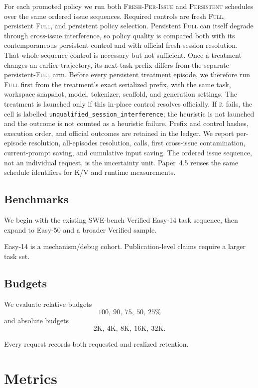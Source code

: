 \documentclass[11pt]{article}
\begin{document}
For each promoted policy we run both \textsc{Fresh-Per-Issue} and
\textsc{Persistent} schedules over the same ordered issue sequences.  Required
controls are fresh \textsc{Full}, persistent \textsc{Full}, and persistent
policy selection.  Persistent \textsc{Full} can itself degrade through
cross-issue interference, so policy quality is compared both with its
contemporaneous persistent control and with official fresh-session resolution.
That whole-sequence control is necessary but not sufficient.  Once a treatment
changes an earlier trajectory, its next-task prefix differs from the separate
persistent-\textsc{Full} arm.  Before every persistent treatment episode, we
therefore run \textsc{Full} first from the treatment's exact serialized prefix,
with the same task, workspace snapshot, model, tokenizer, scaffold, and
generation settings.  The treatment is launched only if this in-place control
resolves officially.  If it fails, the cell is labelled
\texttt{unqualified\_session\_interference}; the heuristic is not launched and
the outcome is not counted as a heuristic failure.  Prefix and control hashes,
execution order, and official outcomes are retained in the ledger.
We report per-episode resolution, all-episodes resolution, calls, first
cross-issue contamination, current-prompt saving, and cumulative input saving.
The ordered issue sequence, not an individual request, is the uncertainty unit.
Paper~4.5 reuses the same schedule identifiers for K/V and runtime measurements.

\subsection{Benchmarks}

We begin with the existing SWE-bench Verified Easy-14 task sequence, then expand
to Easy-50 and a broader Verified sample.

Easy-14 is a mechanism/debug cohort. Publication-level claims require a larger
task set.

\subsection{Budgets}

We evaluate relative budgets
\[
100,\ 90,\ 75,\ 50,\ 25\%
\]
and absolute budgets
\[
2\mathrm K,\ 4\mathrm K,\ 8\mathrm K,\ 16\mathrm K,\ 32\mathrm K.
\]

Every request records both requested and realized retention.

\section{Metrics}
\end{document}

